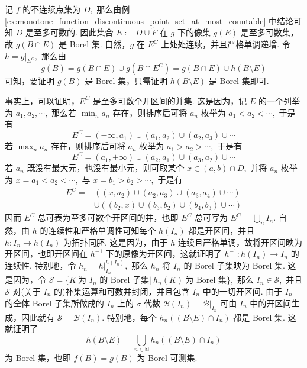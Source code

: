 \documentclass[12pt, a4paper, oneside]{book}
\numberwithin{figure}{section}
\theoremstyle{definition}
\begin{document}
记 $f$ 的不连续点集为 $D,$ 那么由例 \ref{ex:monotone_function_discontinuous_point_set_at_most_countable} 中结论可知 $D$ 是至多可数的. 
因此集合 $E:=D\cup \tilde F$ 在 $g$ 下的像集 $g(E)$ 是至多可数集，故 $g(B\cap E)$ 是 Borel 集. 自然，$g$ 在 $E^C$ 上处处连续，并且严格单调递增. 令 $h=g|_{E^C},$ 那么由
\begin{equation}
    g(B) = g(B\cap E)\cup g(B\cap E^C) = g(B\cap E)\cup h(B\setminus E)
\end{equation}
可知，要证明 $g(B)$ 是 Borel 集，只需证明 $h(B\setminus E)$ 是 Borel 集即可. 

事实上，可以证明，$E^C$ 是至多可数个开区间的并集. 这是因为，记 $E$ 的一个列举为 $a_1,a_2,\cdots,$ 那么若 
$\min_n a_n$ 存在，则排序后可将 $a_n$ 枚举为 $a_1<a_2<\cdots,$ 于是有 
\begin{equation}
    E^C =  (-\infty,a_1)\cup (a_1,a_2)\cup (a_2,a_3)\cup \cdots
\end{equation}
若 $\max_n a_n$ 存在，则排序后可将 $a_n$ 枚举为 $a_1>a_2>\cdots,$ 于是有
\begin{equation}
    E^C =  (a_1,+\infty)\cup (a_2,a_1)\cup (a_3,a_2)\cup\cdots
\end{equation}
若 $a_n$ 既没有最大元，也没有最小元，则可取某个 $x\in (a,b)\cap D,$ 并将 $a_n$ 枚举为 $x=a_1<a_2<\cdots,$ 与 $x=b_1>b_2>\cdots,$ 于是有
\begin{equation}
    \begin{aligned}
        E^C =& \left( (x,a_2)\cup (a_2,a_3)\cup (a_3,a_4)\cup\cdots\right) \\
        &\cup \left( (b_2,x)\cup (b_3,b_2)\cup (b_4,b_3)\cup\cdots\right)
    \end{aligned}
\end{equation}
因而 $E^C$ 总可表为至多可数个开区间的并，也即 $E^C$ 总可写为 $E^C=\bigcup_n I_n.$ 自然，由 $h$ 的连续性和严格单调性可知每个 $h(I_n)$ 都是开区间，并且 $h:I_n\to h(I_n)$ 为拓扑同胚. 这是因为，由于 $h$ 连续且严格单调，故将开区间映为开区间，也即开区间在 $h^{-1}$ 下的原像为开区间，这就证明了 $h^{-1}:h(I_n)\to I_n$ 的连续性. 
特别地，令 $h_n=h|_{I_n}^{h(I_n)},$ 那么 $h_n$ 将 $I_n$ 的 Borel 子集映为 Borel 集. 这是因为，令
$\mathcal S=\{K\ \text{为 $I_n$ 的 Borel 子集}|\ h_n(K)\ \text{为 Borel 集}\},$ 那么 $I_n\in\mathcal S,$ 并且 $\mathcal S$ 对(关于 $I_n$ 的)补集运算和可数并封闭，并且包含 $I_n$ 中的一切开区间. 由于 $I_n$ 的全体 Borel 子集所做成的 $I_n$ 上的 $\sigma$ 代数 $\mathcal B(I_n)=\mathcal B|_{I_n}$ 可由 $I_n$ 中的开区间生成，因此就有 $\mathcal S=\mathcal B(I_n).$ 
特别地，每个 $h_n((B\setminus E)\cap I_n)$ 都是 Borel 集. 这就证明了 
\begin{equation}
    h(B\setminus E) = \bigcup_{n\in\mathbb N} h_n((B\setminus E)\cap I_n)
\end{equation}
为 Borel 集，也即 $f(B)=g(B)$ 为 Borel 可测集.
\end{document}
